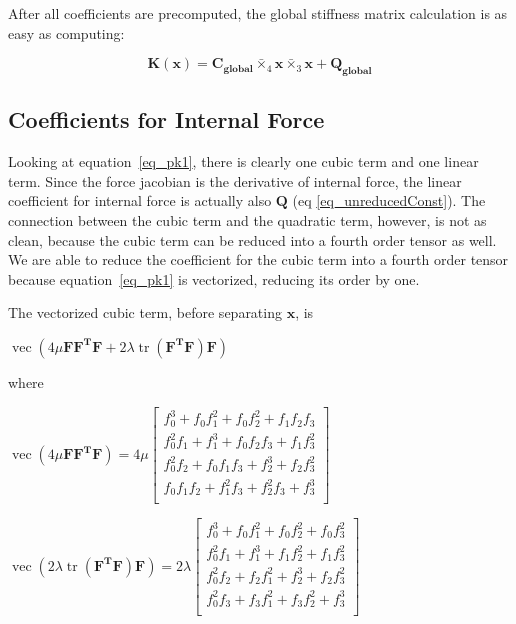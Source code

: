 \documentclass[twocolumn,10pt]{asme2ej}
\DeclareMathOperator{\vect}{vec}
\DeclareMathOperator{\tr}{tr}
\begin{document}
After all coefficients are precomputed, the global stiffness matrix calculation is as easy as computing:

\begin{equation}
  \bm{K}(\bm{x}) = \bm{C_{global}} \bar{\times}_4 \bm{x} \bar{\times}_3 \bm{x} + \bm{Q_{global}}
\end{equation}

\subsection{Coefficients for Internal Force}

Looking at equation~\ref{eq_pk1}, there is clearly one cubic term and one linear term. Since the force jacobian is the derivative of internal force, the linear coefficient for internal force is actually also $\bm{Q}$ (eq \ref{eq_unreducedConst}). The connection between the cubic term and the quadratic term, however, is not as clean, because the cubic term can be reduced into a fourth order tensor as well. We are able to reduce the coefficient for the cubic term into a fourth order tensor because equation~\ref{eq_pk1} is vectorized, reducing its order by one.

The vectorized cubic term, before separating $\bm{x}$, is

\begin{center}
  $\vect \left( 4\mu\bm{FF^TF} + 2\lambda\tr\left(\bm{F^TF}\right)\bm{F}\right)$
\end{center}

where

\begin{center}
  $\vect \left( 4\mu\bm{FF^TF} \right) = 4\mu
  \begin{bmatrix}
    f_{0}^3 + f_0f_{1}^2 + f_0f_{2}^2 + f_1f_2f_3 \\
    f_{0}^2f_{1} + f_{1}^3 + f_0f_2f_3 + f_1f_{3}^2 \\
    f_{0}^2f_{2} + f_0f_1f_3 + f_{2}^3 + f_2f_{3}^2 \\
    f_0f_1f_2 + f_{1}^2f_3 + f_{2}^2f_3 + f_{3}^3 \\
    \end{bmatrix}$

    \bigskip
    $\vect \left( 2\lambda\tr\left(\bm{F^TF}\right)\bm{F} \right) = 2\lambda
    \begin{bmatrix}
      f_{0}^3 + f_0f_{1}^2 + f_0f_{2}^2 + f_0f_{3}^2 \\
      f_{0}^2f_1 + f_{1}^3 + f_1f_{2}^2 + f_1f_{3}^2 \\
      f_{0}^2f_2 + f_2f_{1}^2 + f_{2}^3 + f_2f_{3}^2 \\
      f_{0}^2f_3 + f_3f_{1}^2 + f_3f_{2}^2 + f_{3}^3\\
      \end{bmatrix}$
\end{center}
\end{document}

